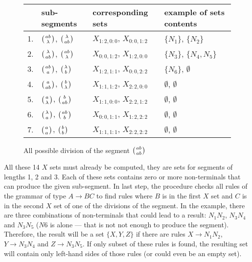 \begin{figure}[H]
  \caption{All possible division of the segment $\wkpair{ab}{ab}$}
  \centering
  \label{tab:segment_divisions}
\begin{tabular}{ |l|l|l|l|  }
  \hline
   & sub-segments & corresponding sets  & example of sets contents \\
  \hline
  1. & $\wkpair{ab}{\lambda}$, $\wkpair{\lambda}{ab}$ & $X_{1:2,0:0}$, $X_{0:0,1:2}$ & $\{N_1\}$, $\{N_2\}$ \\ [1ex]
  2. & $\wkpair{\lambda}{ab}$, $\wkpair{ab}{\lambda}$ & $X_{0:0,1:2}$, $X_{1:2,0:0}$ & $\{N_3\}$, $\{N_4, N_5\}$ \\ [1ex]
  3. & $\wkpair{ab}{a}$, $\wkpair{\lambda}{b}$ & $X_{1:2,1:1}$, $X_{0:0,2:2}$ & $\{N_6\}$, $\emptyset$ \\ [1ex]
  4. & $\wkpair{a}{ab}$, $\wkpair{b}{\lambda}$ & $X_{1:1,1:2}$, $X_{2:2,0:0}$ & $\emptyset$, $\emptyset$ \\ [1ex]
  5. & $\wkpair{a}{\lambda}$, $\wkpair{b}{ab}$ & $X_{1:1,0:0}$, $X_{2:2,1:2}$ & $\emptyset$, $\emptyset$ \\ [1ex]
  6. & $\wkpair{\lambda}{a}$, $\wkpair{ab}{b}$ & $X_{0:0,1:1}$, $X_{1:2,2:2}$ & $\emptyset$, $\emptyset$ \\ [1ex]
  7. & $\wkpair{a}{a}$, $\wkpair{b}{b}$ & $X_{1:1,1:1}$, $X_{2:2,2:2}$ & $\emptyset$, $\emptyset$ \\ [1ex]
  \hline
\end{tabular}
\end{figure}


All these 14 $X$ sets must already be computed, they are sets for segments of lengths 1, 2 and 3. Each of these sets contains zero or more non-terminals that can produce the given sub-segment. In last step, the procedure checks all rules of the grammar of type $A \rightarrow BC$ to find rules where $B$ is in the first $X$ set and $C$ is in the second $X$ set of one of the divisions of the segment. In the example, there are three combinations of non-terminals that could lead to a result: $N_1N_2$, $N_3N_4$ and $N_3N_5$ ($N6$ is alone --- that is not not enough to produce the segment). Therefore, the result will be a set $\{X, Y, Z\}$ if there are rules $X \rightarrow N_1N_2$, $Y \rightarrow N_3N_4$ and $Z \rightarrow N_3N_5$. If only subset of these rules is found, the resulting set will contain only left-hand sides of those rules (or could even be an empty set).



